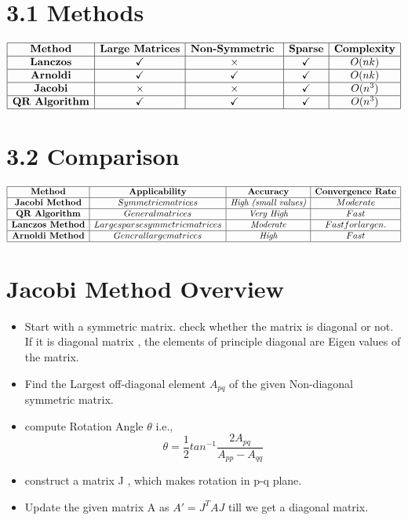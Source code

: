 \documentclass[12pt]{article}
\begin{document}
\section*{3.1 Methods}
\[
\begin{array}{|c|c|c|c|c|}
\hline
\textbf{Method} & \textbf{Large Matrices} & \textbf{Non-Symmetric } & \textbf{Sparse} & \textbf{Complexity} \\ \hline
\textbf{Lanczos} & \checkmark & \times & \checkmark & O(nk) \\ \hline
\textbf{Arnoldi} & \checkmark & \checkmark & \checkmark & O(nk) \\ \hline
\textbf{Jacobi} & \times & \times & \checkmark & O(n^3) \\ \hline
\textbf{QR Algorithm} & \checkmark & \checkmark & \checkmark & O(n^3) \\ \hline
\end{array}
\]

\section*{3.2 Comparison}
\[
\begin{array}{|c|c|c|c|}
\hline
\textbf{Method} & \textbf{Applicability} & \textbf{Accuracy} & \textbf{Convergence Rate}  \\ \hline
\textbf{Jacobi Method} & Symmetric matrices & \textit{High (small values)} & Moderate  \\ \hline
\textbf{QR Algorithm} & General matrices & \textit{Very High} & Fast  \\ \hline
\textbf{Lanczos Method} & Large sparse symmetric matrices & \textit{Moderate} & Fast for large n . \\ \hline
\textbf{Arnoldi Method} & General large matrices & \textit{High} & Fast  \\ \hline
\end{array}
\]


\section{Jacobi Method Overview}
\begin{itemize}
    \item Start with a symmetric matrix. check whether the matrix is diagonal or not. If it is diagonal matrix , the elements of principle diagonal are Eigen values of the matrix.
    \item Find the Largest off-diagonal element $A_{pq}$ of the given Non-diagonal symmetric matrix.
    \item compute Rotation Angle $\theta$ i.e.,
    \begin{equation*}
	    \theta=\frac{1}{2}tan^{-1}{{\frac{2A_{pq}}{A_{pp}-A_{qq}}}}
    \end{equation*}
    \item construct a matrix J , which makes rotation in p-q plane.
    \item Update the given matrix A as $A'=J^TAJ$ till we get a diagonal matrix.
\end{itemize}
\end{document}
